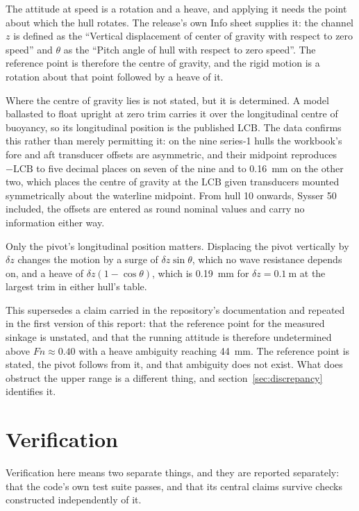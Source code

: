 \documentclass[11pt]{article}
\newcommand{\Fn}{\mathit{Fn}}
\begin{document}
The attitude at speed is a rotation and a heave, and applying it needs the point about which
the hull rotates. The release's own Info sheet supplies it: the channel $z$ is defined as the
``Vertical displacement of center of gravity with respect to zero speed'' and $\theta$ as the
``Pitch angle of hull with respect to zero speed''. The reference point is therefore the
centre of gravity, and the rigid motion is a rotation about that point followed by a heave of
it.

Where the centre of gravity lies is not stated, but it is determined. A model ballasted to
float upright at zero trim carries it over the longitudinal centre of buoyancy, so its
longitudinal position is the published $\mathrm{LCB}$. The data confirms this rather than
merely permitting it: on the nine series-1 hulls the workbook's fore and aft transducer
offsets are asymmetric, and their midpoint reproduces $-\mathrm{LCB}$ to five decimal places
on seven of the nine and to \SI{0.16}{\milli\metre} on the other two, which places the centre
of gravity at the $\mathrm{LCB}$ given transducers mounted symmetrically about the waterline
midpoint. From hull 10 onwards, Sysser 50 included, the offsets are entered as round nominal
values and carry no information either way.

Only the pivot's longitudinal position matters. Displacing the pivot vertically by $\delta z$
changes the motion by a surge of $\delta z \sin\theta$, which no wave resistance depends on,
and a heave of $\delta z(1-\cos\theta)$, which is \SI{0.19}{\milli\metre} for
$\delta z = \SI{0.1}{\metre}$ at the largest trim in either hull's table.

This supersedes a claim carried in the repository's documentation and repeated in the first
version of this report: that the reference point for the measured sinkage is unstated, and
that the running attitude is therefore undetermined above $\Fn \approx 0.40$ with a heave
ambiguity reaching \SI{44}{\milli\metre}. The reference point is stated, the pivot follows
from it, and that ambiguity does not exist. What does obstruct the upper range is a different
thing, and section~\ref{sec:discrepancy} identifies it.

\section{Verification}
Verification here means two separate things, and they are reported separately: that the
code's own test suite passes, and that its central claims survive checks constructed
independently of it.
\end{document}
